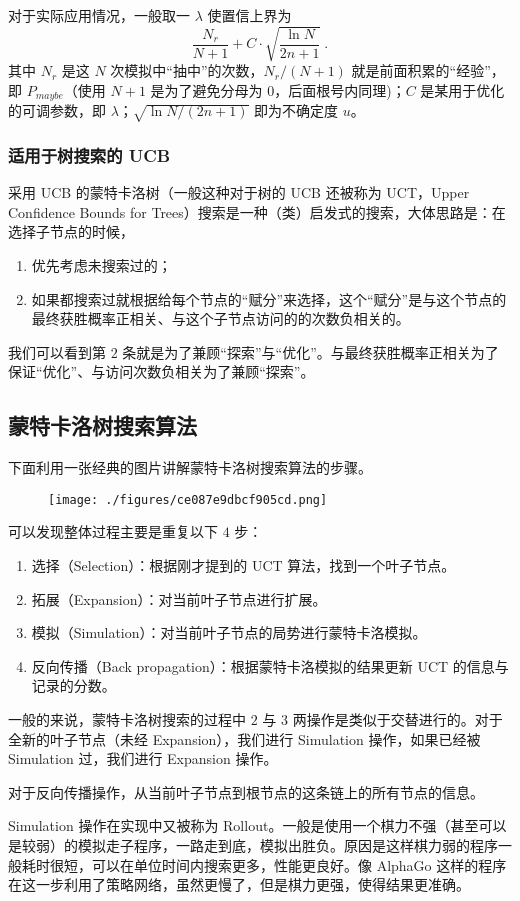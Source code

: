 对于实际应用情况，一般取一 $\lambda$ 使置信上界为
$$\frac{N_r}{N+1} + C \cdot \sqrt{\frac{\ln N}{2n+1}} ~.$$
其中 $N_r$ 是这 $N$ 次模拟中“抽中”的次数，$N_r/(N+1)$ 就是前面积累的“经验”，即 $P_{maybe}$（使用 $N+1$ 是为了避免分母为 $0$，后面根号内同理)；$C$ 是某用于优化的可调参数，即 $\lambda$；$\sqrt{\ln N/(2n+1)}$ 即为不确定度 $u$。

\subsubsection{适用于树搜索的 UCB}
采用 UCB 的蒙特卡洛树（一般这种对于树的 UCB 还被称为 UCT，Upper Confidence Bounds for Trees）搜索是一种（类）启发式的搜索，大体思路是：在选择子节点的时候，
\begin{enumerate}
\item 优先考虑未搜索过的；
\item 如果都搜索过就根据给每个节点的“赋分”来选择，这个“赋分”是与这个节点的最终获胜概率正相关、与这个子节点访问的的次数负相关的。
\end{enumerate}
我们可以看到第 $2$ 条就是为了兼顾“探索”与“优化”。与最终获胜概率正相关为了保证“优化”、与访问次数负相关为了兼顾“探索”。

\subsection{蒙特卡洛树搜索算法}
下面利用一张经典的图片讲解蒙特卡洛树搜索算法的步骤。
\begin{figure}[ht]
\centering
\texttt{[image: ./figures/ce087e9dbcf905cd.png]}
\caption{} \label{fig_MCTS_1}
\end{figure}
可以发现整体过程主要是重复以下 $4$ 步：
\begin{enumerate}
\item 选择（Selection）：根据刚才提到的 UCT 算法，找到一个叶子节点。
\item 拓展（Expansion）：对当前叶子节点进行扩展。
\item 模拟（Simulation）：对当前叶子节点的局势进行蒙特卡洛模拟。
\item 反向传播（Back propagation）：根据蒙特卡洛模拟的结果更新 UCT 的信息与记录的分数。
\end{enumerate}
一般的来说，蒙特卡洛树搜索的过程中 $2$ 与 $3$ 两操作是类似于交替进行的。对于全新的叶子节点（未经 Expansion），我们进行 Simulation 操作，如果已经被 Simulation 过，我们进行 Expansion 操作。

对于反向传播操作，从当前叶子节点到根节点的这条链上的所有节点的信息。

Simulation 操作在实现中又被称为 Rollout。一般是使用一个棋力不强（甚至可以是较弱）的模拟走子程序，一路走到底，模拟出胜负。原因是这样棋力弱的程序一般耗时很短，可以在单位时间内搜索更多，性能更良好。像 AlphaGo 这样的程序在这一步利用了策略网络，虽然更慢了，但是棋力更强，使得结果更准确。

